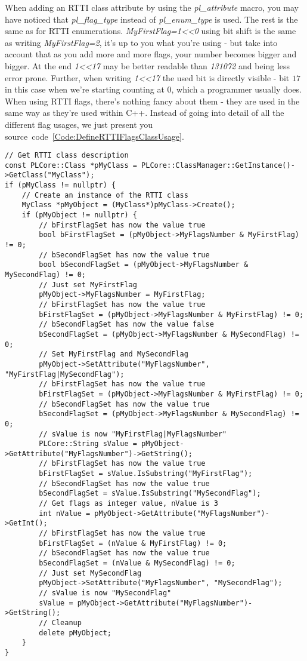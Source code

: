 When adding an \ac{RTTI} class attribute by using the \emph{pl\_attribute} macro, you may have noticed that \emph{pl\_flag\_type} instead of \emph{pl\_enum\_type} is used. The rest is the same as for \ac{RTTI} enumerations. \emph{MyFirstFlag=1<<0} using bit shift is the same as writing \emph{MyFirstFlag=2}, it's up to you what you're using - but take into account that as you add more and more flags, your number becomes bigger and bigger. At the end \emph{1<<17} may be better readable than \emph{131072} and being less error prone. Further, when writing \emph{1<<17} the used bit is directly visible - bit $17$ in this case when we're starting counting at $0$, which a programmer usually does. When using \ac{RTTI} flags, there's nothing fancy about them - they are used in the same way as they're used within C++. Instead of going into detail of all the different flag usages, we just present you source~code~\ref{Code:DefineRTTIFlagsClassUsage}.
\begin{lstlisting}[label=Code:DefineRTTIFlagsClassUsage,caption={Using a \ac{RTTI} class with an flag attribute}]
// Get RTTI class description
const PLCore::Class *pMyClass = PLCore::ClassManager::GetInstance()->GetClass("MyClass");
if (pMyClass != nullptr) {
	// Create an instance of the RTTI class
	MyClass *pMyObject = (MyClass*)pMyClass->Create();
	if (pMyObject != nullptr) {
		// bFirstFlagSet has now the value true
		bool bFirstFlagSet = (pMyObject->MyFlagsNumber & MyFirstFlag) != 0;
		// bSecondFlagSet has now the value true
		bool bSecondFlagSet = (pMyObject->MyFlagsNumber & MySecondFlag) != 0;
		// Just set MyFirstFlag
		pMyObject->MyFlagsNumber = MyFirstFlag;
		// bFirstFlagSet has now the value true
		bFirstFlagSet = (pMyObject->MyFlagsNumber & MyFirstFlag) != 0;
		// bSecondFlagSet has now the value false
		bSecondFlagSet = (pMyObject->MyFlagsNumber & MySecondFlag) != 0;
		// Set MyFirstFlag and MySecondFlag
		pMyObject->SetAttribute("MyFlagsNumber", "MyFirstFlag|MySecondFlag");
		// bFirstFlagSet has now the value true
		bFirstFlagSet = (pMyObject->MyFlagsNumber & MyFirstFlag) != 0;
		// bSecondFlagSet has now the value true
		bSecondFlagSet = (pMyObject->MyFlagsNumber & MySecondFlag) != 0;
		// sValue is now "MyFirstFlag|MyFlagsNumber"
		PLCore::String sValue = pMyObject->GetAttribute("MyFlagsNumber")->GetString();
		// bFirstFlagSet has now the value true
		bFirstFlagSet = sValue.IsSubstring("MyFirstFlag");
		// bSecondFlagSet has now the value true
		bSecondFlagSet = sValue.IsSubstring("MySecondFlag");
		// Get flags as integer value, nValue is 3
		int nValue = pMyObject->GetAttribute("MyFlagsNumber")->GetInt();
		// bFirstFlagSet has now the value true
		bFirstFlagSet = (nValue & MyFirstFlag) != 0;
		// bSecondFlagSet has now the value true
		bSecondFlagSet = (nValue & MySecondFlag) != 0;
		// Just set MySecondFlag
		pMyObject->SetAttribute("MyFlagsNumber", "MySecondFlag");
		// sValue is now "MySecondFlag"
		sValue = pMyObject->GetAttribute("MyFlagsNumber")->GetString();
		// Cleanup
		delete pMyObject;
	}
}
\end{lstlisting}


